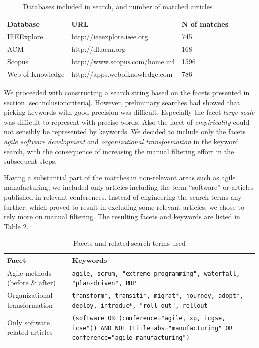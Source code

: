 \begin{table}
    \centering
    \begin{tabular}{ l l l }
        \toprule
        Database         & URL                         & N of matches   \\
        \midrule
        IEEExplore       & http://ieeexplore.ieee.org      & 745 \\ 
        ACM              & http://dl.acm.org               & 168 \\
        Scopus           & http://www.scopus.com/home.url  & 1596 \\
        Web of Knowledge & http://apps.webofknowledge.com  & 786 \\
        \bottomrule
    \end{tabular}
    \caption{Databases included in search, and number of matched articles}
    \label{table:databases}
\end{table}

We proceeded with constructing a search string based on the facets presented in
section \ref{sec:inclusioncriteria}. However, preliminary searches had showed
that picking keywords with good precision was difficult. Especially the facet
\emph{large scale} was difficult to represent with precise words. Also the facet
of \emph{empiricality} could not sensibly be represented by keywords. We decided
to include only the facets \emph{agile software development} and
\emph{organizational transformation} in the keyword search, with the consequence
of increasing the manual filtering effort in the subsequent steps.

Having a substantial part of the matches in non-relevant areas such as agile
manufacturing, we included only articles including the term ``software'' or
articles published in relevant conferences. Instead of engineering the search
terms any further, which proved to result in excluding some relevant articles,
we chose to rely more on manual filtering. The resulting facets and keywords are
listed in Table \ref{table:searchterms}.

\begin{table}
    \centering
    \begin{tabular}{ >{\raggedright\arraybackslash}p{}
                     >{\raggedright\arraybackslash}p{} }
        \toprule
        Facet                  & Keywords   \\
        \midrule
        Agile methods (before \& after) &
            \texttt{agile, scrum, "extreme programming",
            waterfall, "plan-driven", RUP}\\
        Organizational transformation &
            \texttt{transform*, transiti*, migrat*, journey, adopt*, deploy, introduc*,
            "roll-out", rollout}\\
        Only software related articles &
            \texttt{(software OR (conference="agile, xp, icgse, icse"))
            AND NOT (title+abs="manufacturing" OR conference="agile manufacturing")}
        \\
        \bottomrule
    \end{tabular}
    \caption{Facets and related search terms used}
    \label{table:searchterms}
\end{table}

